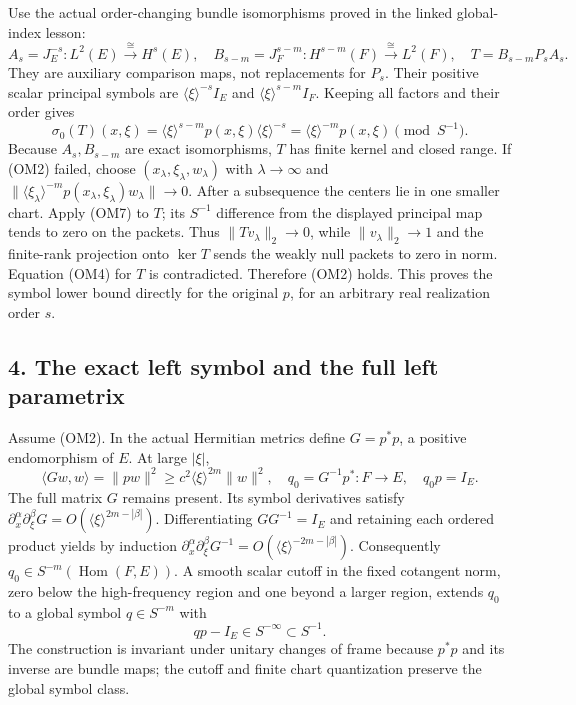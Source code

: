 \documentclass[
  11pt,
]{article}
\makeatletter
\let\ReaderOriginalAnchorStart\hyper@anchorstart
\let\ReaderOriginalAnchorEnd\hyper@anchorend
\let\ReaderPendingAliases\@empty
\def\ReaderArmAliases#1{\gdef\ReaderPendingAliases{#1}}
\def\hyper@anchorstart#1{\ReaderIfNativeAnchorTF{#1}{\ReaderPendingAliases\global\let\ReaderPendingAliases\@empty}{}\ReaderOriginalAnchorStart{#1}}
\makeatother
\begin{document}
Use the actual order-changing bundle isomorphisms proved in the linked
global-index lesson: \[
 A_s=J_E^{-s}:L^2(E)\xrightarrow{\;\cong\;}H^s(E),\quad
 B_{s-m}=J_F^{s-m}:H^{s-m}(F)\xrightarrow{\;\cong\;}L^2(F),\quad
 T=B_{s-m}P_sA_s.
 \tag{OM9}
\] They are auxiliary comparison maps, not replacements for \(P_s\).
Their positive scalar principal symbols are
\(\langle\xi\rangle^{-s}I_E\) and \(\langle\xi\rangle^{s-m}I_F\).
Keeping all factors and their order gives \[
 \sigma_0(T)(x,\xi)
 =\langle\xi\rangle^{s-m}p(x,\xi)\langle\xi\rangle^{-s}
 =\langle\xi\rangle^{-m}p(x,\xi)
 \pmod {S^{-1}}.
 \tag{OM10}
\] Because \(A_s,B_{s-m}\) are exact isomorphisms, \(T\) has finite
kernel and closed range. If (OM2) failed, choose
\((x_\lambda,\xi_\lambda,w_\lambda)\) with \(\lambda\to\infty\) and
\(\|\langle\xi_\lambda\rangle^{-m}p(x_\lambda,\xi_\lambda)w_\lambda\|\to0\).
After a subsequence the centers lie in one smaller chart. Apply (OM7) to
\(T\); its \(S^{-1}\) difference from the displayed principal map tends
to zero on the packets. Thus \(\|Tv_\lambda\|_2\to0\), while
\(\|v_\lambda\|_2\to1\) and the finite-rank projection onto \(\ker T\)
sends the weakly null packets to zero in norm. Equation (OM4) for \(T\)
is contradicted. Therefore (OM2) holds. This proves the symbol lower
bound directly for the original \(p\), for an arbitrary real realization
order \(s\).

\ReaderArmAliases{\ReaderOriginalAnchorStart{AN03-OMF-004}\ReaderOriginalAnchorEnd\begingroup\expandafter\def\csname @currentHref\endcsname{AN03-OMF-004}\label{AN03-OMF-004}\endgroup\ReaderOriginalAnchorStart{4-the-exact-left-symbol-and-the-full-left-parametrix}\ReaderOriginalAnchorEnd\begingroup\expandafter\def\csname @currentHref\endcsname{4-the-exact-left-symbol-and-the-full-left-parametrix}\label{4-the-exact-left-symbol-and-the-full-left-parametrix}\endgroup}
\subsection{4. The exact left symbol and the full left
parametrix}\label{the-exact-left-symbol-and-the-full-left-parametrix}

Assume (OM2). In the actual Hermitian metrics define \(G=p^*p\), a
positive endomorphism of \(E\). At large \(|\xi|\), \[
 \langle Gw,w\rangle=\|pw\|^2
 \ge c^2\langle\xi\rangle^{2m}\|w\|^2,\quad
 q_0=G^{-1}p^*:F\longrightarrow E,\quad
 q_0p=I_E.
 \tag{OM11}
\] The full matrix \(G\) remains present. Its symbol derivatives satisfy
\(\partial_x^\alpha\partial_\xi^\beta G
 =O(\langle\xi\rangle^{2m-|\beta|})\). Differentiating \(GG^{-1}=I_E\)
and retaining each ordered product yields by induction
\(\partial_x^\alpha\partial_\xi^\beta G^{-1}
 =O(\langle\xi\rangle^{-2m-|\beta|})\). Consequently
\(q_0\in S^{-m}(\operatorname{Hom}(F,E))\). A smooth scalar cutoff in
the fixed cotangent norm, zero below the high-frequency region and one
beyond a larger region, extends \(q_0\) to a global symbol
\(q\in S^{-m}\) with \[
 qp-I_E\in S^{-\infty}\subset S^{-1}.
 \tag{OM12}
\] The construction is invariant under unitary changes of frame because
\(p^*p\) and its inverse are bundle maps; the cutoff and finite chart
quantization preserve the global symbol class.
\end{document}
